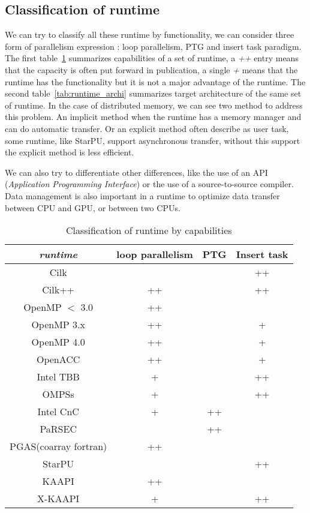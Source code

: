\subsection{Classification of runtime}
We can try to classify all these runtime by functionality, we can consider three form of parallelism expression : loop parallelism, PTG and insert task paradigm.
%
The first table~\ref{tab:runtime_family} summarizes capabilities of a set of runtime, a {\it ++} entry means that the capacity is often put forward in publication, a single {\it +} means that the runtime has the functionality but it is not a major advantage of the runtime.
%
The second table~\ref{tab:runtime_archi} summarizes target architecture of the same set of runtime.
%
In the case of distributed memory, we can see two method to address this problem.
An implicit method when the runtime has a memory manager and can do automatic transfer.
Or an explicit method often describe as user task, some runtime, like StarPU, support asynchronous transfer, without this support the explicit method is less efficient.


We can also try to differentiate other differences, like the use of an API ({\it Application Programming Interface}) or the use of a source-to-source compiler.
%
Data management is also important in a runtime to optimize data transfer between CPU and GPU, or between two CPUs.

\begin{table}[h!]
\centering
\begin{tabular}{c|ccc}
  \textit{runtime}& loop parallelism & PTG & Insert task\\
  \hline
        Cilk           &    &    & ++ \\
        Cilk++         & ++ &    & ++ \\
        OpenMP $<$ 3.0 & ++ &    &    \\
        OpenMP 3.x     & ++ &    & +  \\
        OpenMP 4.0     & ++ &    & +  \\
        OpenACC        & ++ &    & +  \\
        Intel TBB      & +  &    & ++ \\
        OMPSs          & +  &    & ++ \\
        Intel CnC      & +  & ++ &    \\
        PaRSEC         &    & ++ &    \\
 PGAS(coarray fortran) & ++ &    &    \\
        StarPU         &    &    & ++ \\
        KAAPI          & ++ &    &    \\
        X-KAAPI        & +  &    & ++
\end{tabular}
\caption{Classification of runtime by capabilities}
\label{tab:runtime_family}
\end{table}

